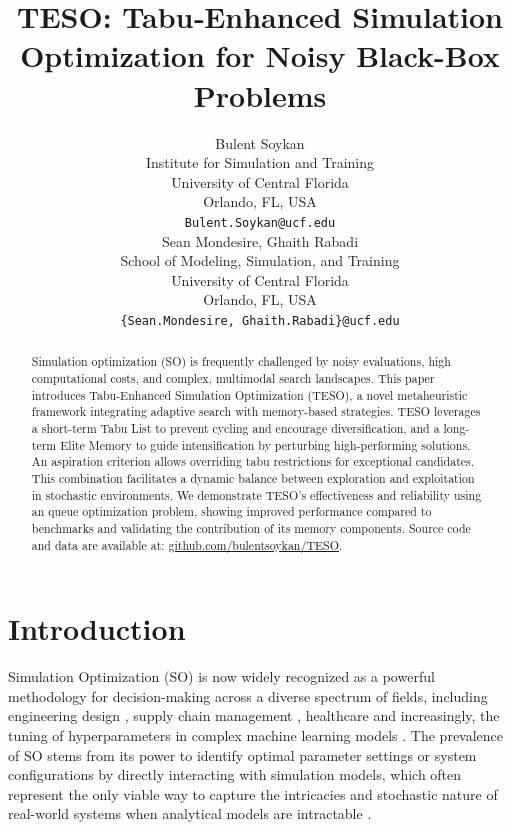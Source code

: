 \documentclass{article}
\title{TESO: Tabu‐Enhanced Simulation Optimization for Noisy Black-Box Problems
}
\author{
  Bulent Soykan \\
  Institute for Simulation and Training \\
  University of Central Florida \\
  Orlando, FL, USA\\
  \texttt{Bulent.Soykan@ucf.edu} \\
   \And
  Sean Mondesire, Ghaith Rabadi \\
  School of Modeling, Simulation, and Training \\
  University of Central Florida \\
  Orlando, FL, USA\\
  \texttt{\{Sean.Mondesire, Ghaith.Rabadi\}@ucf.edu} \\
}
\begin{document}
\maketitle


\begin{abstract}
Simulation optimization (SO) is frequently challenged by noisy evaluations, high computational costs, and complex, multimodal search landscapes. This paper introduces Tabu-Enhanced Simulation Optimization (TESO), a novel metaheuristic framework integrating adaptive search with memory-based strategies. TESO leverages a short-term Tabu List to prevent cycling and encourage diversification, and a long-term Elite Memory to guide intensification by perturbing high-performing solutions. An aspiration criterion allows overriding tabu restrictions for exceptional candidates. This combination facilitates a dynamic balance between exploration and exploitation in stochastic environments. We demonstrate TESO's effectiveness and reliability using an queue optimization problem, showing improved performance compared to benchmarks and validating the contribution of its memory components. Source code and data are available at: \href{https://github.com/bulentsoykan/TESO}{github.com/bulentsoykan/TESO}.
\end{abstract}




\section{Introduction}
\label{sec:intro}

Simulation Optimization (SO) is now widely recognized as a powerful methodology for decision-making across a diverse spectrum of fields, including engineering design \cite{deng2007simulation}, supply chain management \cite{jung2004simulation}, healthcare \cite{lal2015simulation} and increasingly, the tuning of hyperparameters in complex machine learning models \cite{amaran2016simulation}. The prevalence of SO stems from its power to identify optimal parameter settings or system configurations by directly interacting with simulation models, which often represent the only viable way to capture the intricacies and stochastic nature of real-world systems when analytical models are intractable \cite{10408315}.
\end{document}
